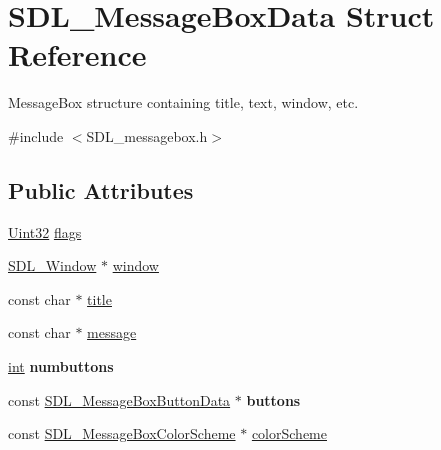 \hypertarget{structSDL__MessageBoxData}{}\section{S\+D\+L\+\_\+\+Message\+Box\+Data Struct Reference}
\label{structSDL__MessageBoxData}


Message\+Box structure containing title, text, window, etc.  




{\ttfamily \#include $<$S\+D\+L\+\_\+messagebox.\+h$>$}

\subsection*{Public Attributes}
\begin{DoxyCompactItemize}
\item 
\hyperlink{SDL__stdinc_8h_add440eff171ea5f55cb00c4a9ab8672d}{Uint32} \hyperlink{structSDL__MessageBoxData_a113d016f760bf4e4156b0f376358d6a0}{flags}
\item 
\hyperlink{SDL__video_8h_a55a196c7d3b8497538632c79ae1e6392}{S\+D\+L\+\_\+\+Window} $\ast$ \hyperlink{structSDL__MessageBoxData_a5c333bc93705c66068e140bc28daedcb}{window}
\item 
const char $\ast$ \hyperlink{structSDL__MessageBoxData_a93ceeafeed20b553ad4c86c9be37f117}{title}
\item 
const char $\ast$ \hyperlink{structSDL__MessageBoxData_ada6ae208a1f85adabbd7a7a08ca609c8}{message}
\item 
\hypertarget{structSDL__MessageBoxData_a133f4fef549cc0cb14b799af35f3dc5a}{}\hyperlink{SDL__thread_8h_a6a64f9be4433e4de6e2f2f548cf3c08e}{int} {\bfseries numbuttons}\label{structSDL__MessageBoxData_a133f4fef549cc0cb14b799af35f3dc5a}

\item 
\hypertarget{structSDL__MessageBoxData_a265e47aab749e384661ae91d3e11e0db}{}const \hyperlink{structSDL__MessageBoxButtonData}{S\+D\+L\+\_\+\+Message\+Box\+Button\+Data} $\ast$ {\bfseries buttons}\label{structSDL__MessageBoxData_a265e47aab749e384661ae91d3e11e0db}

\item 
const \hyperlink{structSDL__MessageBoxColorScheme}{S\+D\+L\+\_\+\+Message\+Box\+Color\+Scheme} $\ast$ \hyperlink{structSDL__MessageBoxData_a18744865a3e89e260db5f01aee579e35}{color\+Scheme}
\end{DoxyCompactItemize}


